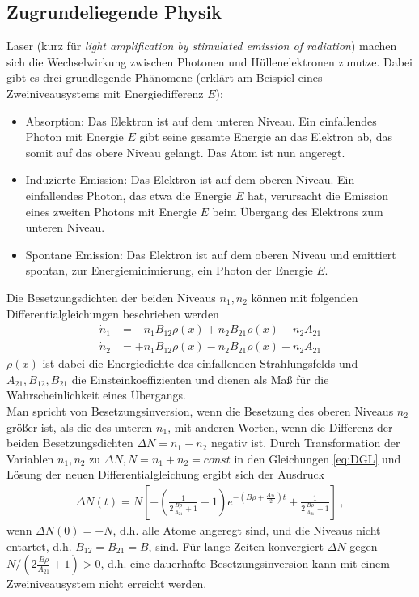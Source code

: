 \subsection{Zugrundeliegende Physik}
Laser (kurz für \textit{light amplification by stimulated emission of radiation}) machen sich die Wechselwirkung zwischen Photonen und Hüllenelektronen zunutze. Dabei gibt es drei grundlegende Phänomene (erklärt am Beispiel eines Zweiniveausystems mit Energiedifferenz $E$):
\begin{itemize}
	\item Absorption: Das Elektron ist auf dem unteren Niveau. Ein einfallendes Photon mit Energie $E$ gibt seine gesamte Energie an das Elektron ab, das somit auf das obere Niveau gelangt. Das Atom ist nun angeregt.
	\item Induzierte Emission: Das Elektron ist auf dem oberen Niveau. Ein einfallendes Photon, das etwa die Energie $E$ hat, verursacht die Emission eines zweiten Photons mit Energie $E$ beim Übergang des Elektrons zum unteren Niveau.
	\item Spontane Emission: Das Elektron ist auf dem oberen Niveau und emittiert spontan, zur Energieminimierung, ein Photon der Energie $E$.
\end{itemize}
Die Besetzungsdichten der beiden Niveaus $n_1,n_2$ können mit folgenden Differentialgleichungen beschrieben werden
\begin{align}\label{eq:DGL}
	\dot{n}_1 &= - n_1B_{12}\rho(x) + n_2B_{21}\rho(x) + n_2A_{21} \nonumber\\
	\dot{n}_2 &= + n_1B_{12}\rho(x) - n_2B_{21}\rho(x) - n_2A_{21}
\end{align}
$\rho(x)$ ist dabei die Energiedichte des einfallenden Strahlungsfelds und $A_{21}, B_{12}, B_{21}$ die Einsteinkoeffizienten und dienen als Maß für die Wahrscheinlichkeit eines Übergangs. \\
Man spricht von Besetzungsinversion, wenn die Besetzung des oberen Niveaus $n_2$ größer ist, als die des unteren $n_1$, mit anderen Worten, wenn die Differenz der beiden Besetzungsdichten $\Delta N = n_1-n_2$ negativ ist. Durch Transformation der Variablen $n_1,n_2$ zu $\Delta N, N=n_1+n_2=const$ in den Gleichungen \eqref{eq:DGL} und Lösung der neuen Differentialgleichung ergibt sich der Ausdruck
\begin{align}
	\Delta N(t) = N \left[ -\left(\frac{1}{2\frac{B\rho}{A_{21}}+1}+1\right)
	 e^{-\left(B\rho+\frac{A_{21}}{2}\right)t} + \frac{1}{2\frac{B\rho}{A_{21}}+1} \right]\ ,
\end{align}
wenn $\Delta N(0) = -N$, d.h. alle Atome angeregt sind, und die Niveaus nicht entartet, d.h. $B_{12}=B_{21}=B$, sind. Für lange Zeiten konvergiert $\Delta N$ gegen $N\slash(2\frac{B\rho}{A_{21}}+1) > 0$, d.h. eine dauerhafte Besetzungsinversion kann mit einem Zweiniveausystem nicht erreicht werden.
